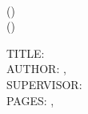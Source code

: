 \noindent
\thesisInstitution{} \\
\thesisTargetDegreeName{} (\thesisSubmissionYear{}) \\
\thesisCityProvince{} (\thesisInstitutionDepartment{}) 

\vspace{2cm}

\noindent
TITLE: \thesisTitle{} \\
AUTHOR: \thesisAuthorName{}, \thesisAuthorCredentials{} \\
SUPERVISOR: \thesisSupervisor{} \\
PAGES: \pageref{lastOfFrontMatter}, \pageref{LastPage}
